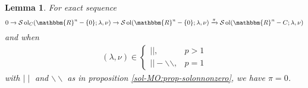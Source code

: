 \documentclass{article}
\newcommand{\tmop}[1]{\ensuremath{\operatorname{#1}}}
\newcommand{\um}{-}
\numberwithin{definition}{section}
\newtheorem{lemma}{Lemma}
\numberwithin{lemma}{section}
\numberwithin{proposition}{section}
{\theorembodyfont{\rmfamily}\newtheorem{remark}{Remark}
\numberwithin{remark}{section}
}
\begin{document}
\begin{lemma}
  \label{sol-MO:lem-zeromap}For exact sequence
  \[ 0 \rightarrow \mathcal{S} \tmop{ol}_C ( \mathbbm{R}^n - \{ 0 \} ;
     \lambda, \nu) \rightarrow \mathcal{S} \tmop{ol} ( \mathbbm{R}^n - \{ 0 \}
     ; \lambda, \nu) \xrightarrow{\pi} \mathcal{S} \tmop{ol} ( \mathbbm{R}^n -
     C ; \lambda, \nu) \]
  and when
  \begin{eqnarray}
    & ( \lambda, \nu) \in \left\{ \begin{array}{ll}
      | |, & p > 1\\
      | | \um \backslash\backslash, & p = 1
    \end{array} \right. &  \nonumber
  \end{eqnarray}
  with $\mid \mid$ and $\backslash\backslash$ as in proposition
  \ref{sol-MO:prop-solonnonzero}, we have $\pi = 0$.
\end{lemma}
\end{document}
